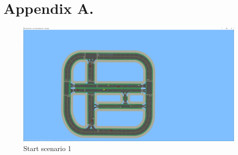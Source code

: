 \chapter{Appendix A.}


\begin{figure}[H] 
	\label{figure:appednix:start_scenario_1}
	\includegraphics[width=1\linewidth]{figures/start_scenario_1}
	\caption{Start scenario 1}
\end{figure}



